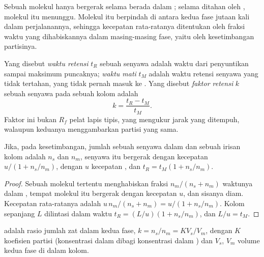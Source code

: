 Sebuah molekul hanya bergerak selama berada dalam ; selama
ditahan oleh , molekul itu menunggu. Molekul itu berpindah di
antara kedua fase jutaan kali dalam perjalanannya, sehingga kecepatan
rata-ratanya ditentukan oleh fraksi waktu yang dihabiskannya dalam
masing-masing fase, yaitu oleh kesetimbangan partisinya.

\begin{definition}[Retensi]\label{def:b2:chromatography:retention}
Yang disebut \emph{waktu retensi} $t_R$ sebuah senyawa
adalah waktu dari penyuntikan sampai maksimum puncaknya; \emph{waktu
mati} $t_M$ adalah waktu retensi senyawa yang tidak
tertahan, yang tidak pernah masuk ke . Yang disebut \emph{faktor retensi}
$k$ sebuah senyawa pada sebuah kolom adalah
\begin{equation*}
k = \frac{t_R - t_M}{t_M}.
\end{equation*}
Faktor ini bukan $R_f$ pelat lapis tipis, yang mengukur jarak yang
ditempuh, walaupun keduanya menggambarkan partisi yang sama.
\end{definition}

\begin{proposition}\label{prop:b2:chromatography:retention-time}
Jika, pada kesetimbangan, jumlah sebuah senyawa dalam  dan  sebuah irisan kolom adalah $n_s$ dan $n_m$, senyawa itu bergerak
dengan kecepatan $u/(1 + n_s/n_m)$, dengan $u$ kecepatan ,
dan $t_R = t_M(1 + n_s/n_m)$.
\end{proposition}

\begin{proof}
Sebuah molekul tertentu menghabiskan fraksi $n_m/(n_s + n_m)$ waktunya
dalam , tempat molekul itu bergerak dengan kecepatan
$u$, dan sisanya diam. Kecepatan rata-ratanya adalah $u\,n_m/(n_s + n_m) = u/(1 + n_s/n_m)$.
Kolom sepanjang
$L$ dilintasi dalam waktu $t_R = (L/u)(1 + n_s/n_m)$, dan $L/u = t_M$.
\end{proof}

\begin{proposition}\label{prop:b2:chromatography:k-and-K}
 adalah rasio jumlah zat dalam kedua fase, $k = n_s/n_m = KV_s/V_m$, dengan $K$
koefisien partisi (konsentrasi dalam  dibagi konsentrasi dalam
) dan $V_s$, $V_m$ volume kedua fase di dalam kolom.
\end{proposition}

